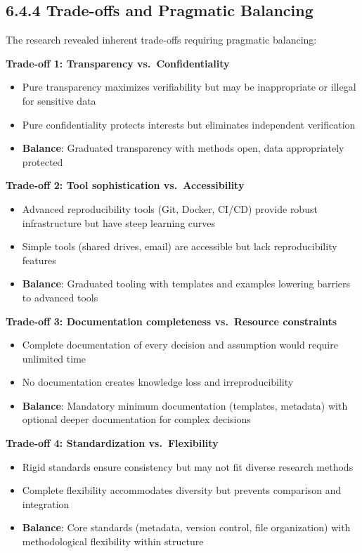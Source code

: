 \documentclass[
  oneside,
  open=any]{scrbook}
\providecommand{\tightlist}{%
  \setlength{\itemsep}{0pt}\setlength{\parskip}{0pt}}\usepackage{longtable,booktabs,array}
\begin{document}
\subsection{6.4.4 Trade-offs and Pragmatic
Balancing}\label{trade-offs-and-pragmatic-balancing}

The research revealed inherent trade-offs requiring pragmatic balancing:

\textbf{Trade-off 1: Transparency vs.~Confidentiality}

\begin{itemize}
\tightlist
\item
  Pure transparency maximizes verifiability but may be inappropriate or
  illegal for sensitive data
\item
  Pure confidentiality protects interests but eliminates independent
  verification
\item
  \textbf{Balance}: Graduated transparency with methods open, data
  appropriately protected
\end{itemize}

\textbf{Trade-off 2: Tool sophistication vs.~Accessibility}

\begin{itemize}
\tightlist
\item
  Advanced reproducibility tools (Git, Docker, CI/CD) provide robust
  infrastructure but have steep learning curves
\item
  Simple tools (shared drives, email) are accessible but lack
  reproducibility features
\item
  \textbf{Balance}: Graduated tooling with templates and examples
  lowering barriers to advanced tools
\end{itemize}

\textbf{Trade-off 3: Documentation completeness vs.~Resource
constraints}

\begin{itemize}
\tightlist
\item
  Complete documentation of every decision and assumption would require
  unlimited time
\item
  No documentation creates knowledge loss and irreproducibility
\item
  \textbf{Balance}: Mandatory minimum documentation (templates,
  metadata) with optional deeper documentation for complex decisions
\end{itemize}

\textbf{Trade-off 4: Standardization vs.~Flexibility}

\begin{itemize}
\tightlist
\item
  Rigid standards ensure consistency but may not fit diverse research
  methods
\item
  Complete flexibility accommodates diversity but prevents comparison
  and integration
\item
  \textbf{Balance}: Core standards (metadata, version control, file
  organization) with methodological flexibility within structure
\end{itemize}
\end{document}
